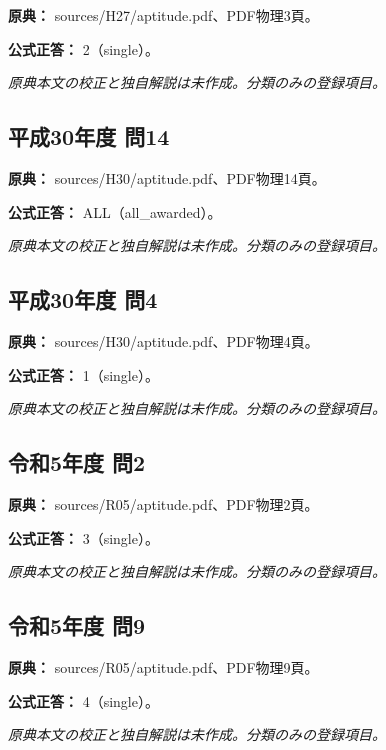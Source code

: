 \noindent\textbf{原典：} sources/H27/aptitude.pdf、PDF物理3頁。

\textbf{公式正答：} 2（single）。

\par\textit{原典本文の校正と独自解説は未作成。分類のみの登録項目。}

\subsection{平成30年度 問14}
\label{q:h30-reg-apt-14}

\noindent\textbf{原典：} sources/H30/aptitude.pdf、PDF物理14頁。

\textbf{公式正答：} ALL（all\_awarded）。

\par\textit{原典本文の校正と独自解説は未作成。分類のみの登録項目。}

\subsection{平成30年度 問4}
\label{q:h30-reg-apt-04}

\noindent\textbf{原典：} sources/H30/aptitude.pdf、PDF物理4頁。

\textbf{公式正答：} 1（single）。

\par\textit{原典本文の校正と独自解説は未作成。分類のみの登録項目。}

\subsection{令和5年度 問2}
\label{q:r05-reg-apt-02}

\noindent\textbf{原典：} sources/R05/aptitude.pdf、PDF物理2頁。

\textbf{公式正答：} 3（single）。

\par\textit{原典本文の校正と独自解説は未作成。分類のみの登録項目。}

\subsection{令和5年度 問9}
\label{q:r05-reg-apt-09}

\noindent\textbf{原典：} sources/R05/aptitude.pdf、PDF物理9頁。

\textbf{公式正答：} 4（single）。

\par\textit{原典本文の校正と独自解説は未作成。分類のみの登録項目。}
